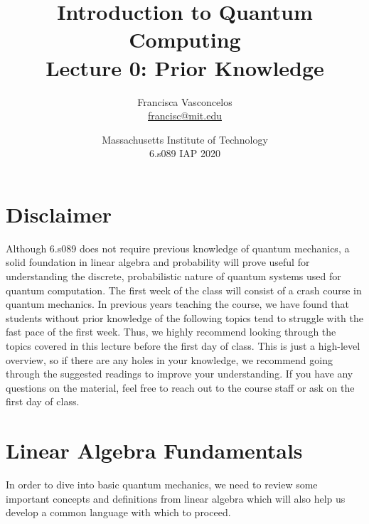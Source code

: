 \documentclass[11pt]{article} %
\author{Francisca Vasconcelos\\\href{mailto:francisc@mit.edu}{francisc@mit.edu}}
\title{Introduction to Quantum Computing\\Lecture 0: Prior Knowledge}
\date{Massachusetts Institute of Technology\\6.s089 IAP 2020}
\begin{document}
\maketitle
\newpage
\tableofcontents
\newpage


\section{Disclaimer}
Although 6.s089 does not require previous knowledge of quantum mechanics, a solid foundation in linear algebra and probability will prove useful for understanding the discrete, probabilistic nature of quantum systems used for quantum computation. The first week of the class will consist of a crash course in quantum mechanics. In previous years teaching the course, we have found that students without prior knowledge of the following topics tend to struggle with the fast pace of the first week. Thus, we highly recommend looking through the topics covered in this lecture before the first day of class. This is just a high-level overview, so if there are any holes in your knowledge, we recommend going through the suggested readings to improve your understanding. If you have any questions on the material, feel free to reach out to the course staff or ask on the first day of class.


\newpage

\section{Linear Algebra Fundamentals}

In order to dive into basic quantum mechanics, we need to review some important concepts and definitions from linear algebra which will also help us develop a common language with which to proceed.
\end{document}
